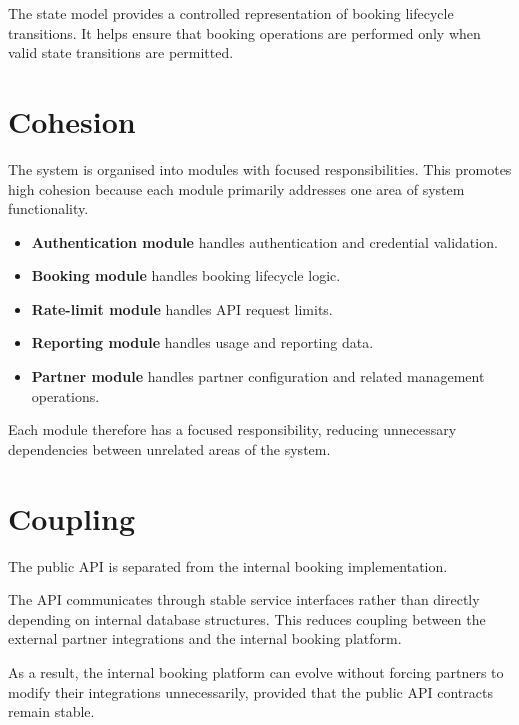 \documentclass[12pt,a4paper]{article}
\begin{document}
The state model provides a controlled representation of booking
lifecycle transitions. It helps ensure that booking operations are
performed only when valid state transitions are permitted.


\section{Cohesion}

The system is organised into modules with focused responsibilities.
This promotes high cohesion because each module primarily addresses
one area of system functionality.

\begin{itemize}
    \item \textbf{Authentication module} handles authentication and
    credential validation.
    \item \textbf{Booking module} handles booking lifecycle logic.
    \item \textbf{Rate-limit module} handles API request limits.
    \item \textbf{Reporting module} handles usage and reporting data.
    \item \textbf{Partner module} handles partner configuration and
    related management operations.
\end{itemize}

Each module therefore has a focused responsibility, reducing
unnecessary dependencies between unrelated areas of the system.


\section{Coupling}

The public API is separated from the internal booking
implementation.

The API communicates through stable service interfaces rather than
directly depending on internal database structures. This reduces
coupling between the external partner integrations and the internal
booking platform.

As a result, the internal booking platform can evolve without
forcing partners to modify their integrations unnecessarily,
provided that the public API contracts remain stable.
\end{document}

